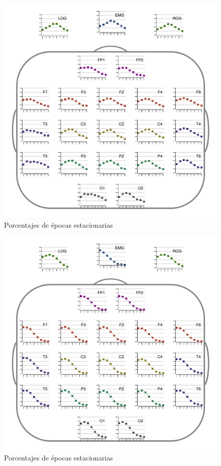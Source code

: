 \begin{figure}
\centering
\includegraphics[width=.9\linewidth]{./img_resultados/RRMNS_cabeza_epocas_.pdf}
\caption{Porcentajes de épocas estacionarias}
\end{figure}

\begin{figure}
\centering
\includegraphics[width=.9\linewidth]{./img_resultados/JGMN6SUE_cabeza_epocas_.pdf}
\caption{Porcentajes de épocas estacionarias}
\end{figure}

